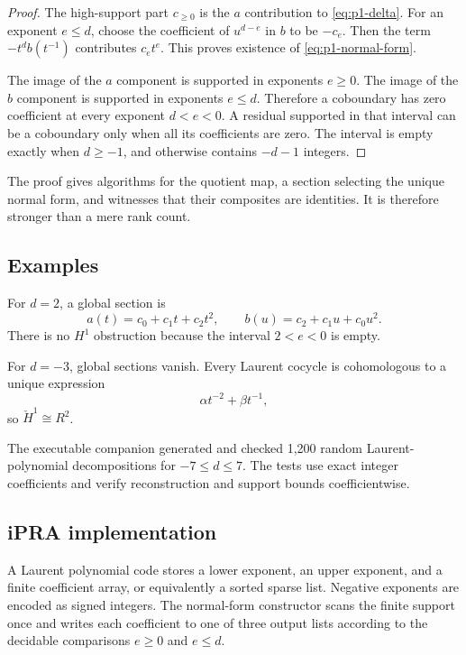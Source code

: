 \begin{proof}
The high-support part $c_{\geq0}$ is the $a$ contribution to \eqref{eq:p1-delta}.  For an exponent
$e\leq d$, choose the coefficient of $u^{d-e}$ in $b$ to be $-c_e$.  Then the term
$-t^d b(t^{-1})$ contributes $c_e t^e$.  This proves existence of
\eqref{eq:p1-normal-form}.

The image of the $a$ component is supported in exponents $e\geq0$.  The image of the $b$ component is
supported in exponents $e\leq d$.  Therefore a coboundary has zero coefficient at every exponent
$d<e<0$.  A residual supported in that interval can be a coboundary only when all its coefficients
are zero.  The interval is empty exactly when $d\geq-1$, and otherwise contains
$-d-1$ integers.
\end{proof}

The proof gives algorithms for the quotient map, a section selecting the unique normal form, and
witnesses that their composites are identities.  It is therefore stronger than a mere rank count.

\subsection{Examples}

For $d=2$, a global section is
\[
  a(t)=c_0+c_1t+c_2t^2,
  \qquad
  b(u)=c_2+c_1u+c_0u^2.
\]
There is no $H^1$ obstruction because the interval $2<e<0$ is empty.

For $d=-3$, global sections vanish.  Every Laurent cocycle is cohomologous to a unique expression
\[
                       \alpha t^{-2}+\beta t^{-1},
\]
so $\check H^1\cong R^2$.

The executable companion generated and checked 1,200 random Laurent-polynomial decompositions for
$-7\leq d\leq7$.  The tests use exact integer coefficients and verify reconstruction and support
bounds coefficientwise.

\subsection{iPRA implementation}

A Laurent polynomial code stores a lower exponent, an upper exponent, and a finite coefficient
array, or equivalently a sorted sparse list.  Negative exponents are encoded as signed integers.
The normal-form constructor scans the finite support once and writes each coefficient to one of
three output lists according to the decidable comparisons $e\geq0$ and $e\leq d$.

